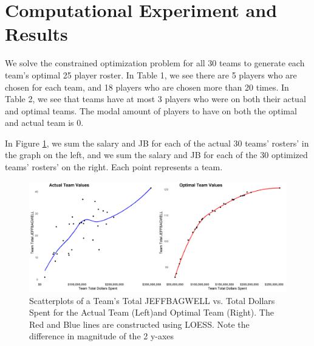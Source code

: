 \documentclass{article}
\begin{document}
\section{Computational Experiment and Results}

We solve the constrained optimization problem for all 30 teams to generate each team's optimal 25 player roster. In Table 1, we see there are 5 players who are chosen for each team, and 18 players who are chosen more than 20 times. In Table 2, we see that teams have at most 3 players who were on both their actual and optimal teams. The modal amount of players to have on both the optimal and actual team is 0. 

\label{tab:teams_picked}


\label{tab:optimal_and_actual}


In Figure \ref{fig:cowplot}, we sum the salary and JB for each of the actual 30 teams' rosters' in the graph on the left, and we sum the salary and JB for each of the 30 optimized teams' rosters' on the right. Each point represents a team.


\begin{figure}[h]
\caption{Scatterplots of a Team's Total JEFFBAGWELL vs. Total Dollars Spent for the Actual Team (Left)and Optimal Team (Right). The Red and Blue lines are constructed using LOESS. Note the difference in magnitude of the 2 y-axes} 
\label{fig:cowplot}
\centering
\includegraphics[width=0.7\paperwidth, scale=1.25]{bwar_salary_scatter_cowplot.png}
\end{figure}


%
\end{document}

